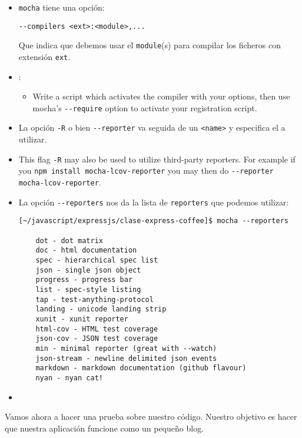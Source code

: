 \begin{itemize}
\item
\verb|mocha| tiene una opción:
\begin{verbatim}
--compilers <ext>:<module>,...  
\end{verbatim}
Que indica que debemos usar el \verb|module|(s) para compilar los ficheros
con extensión \verb|ext|.
\item
{}:

\begin{itemize}
\item
Write a script which activates the compiler with your options, 
then use mocha's \verb|--require| option to activate your registration script.
\end{itemize}
\item
La opción \verb|-R| o bien \verb|--reporter| va seguida de un \verb|<name>|
y especifica el  a utilizar.
\item
This flag \verb|-R| may also be used to utilize third-party reporters. For example if you 
\verb|npm install mocha-lcov-reporter| 
you may then do \verb|--reporter mocha-lcov-reporter|.
\item
La  opción \verb|--reporters| nos da la lista de \verb|reporters| que 
podemos utilizar:
\begin{verbatim}
[~/javascript/expressjs/clase-express-coffee]$ mocha --reporters

    dot - dot matrix
    doc - html documentation
    spec - hierarchical spec list
    json - single json object
    progress - progress bar
    list - spec-style listing
    tap - test-anything-protocol
    landing - unicode landing strip
    xunit - xunit reporter
    html-cov - HTML test coverage
    json-cov - JSON test coverage
    min - minimal reporter (great with --watch)
    json-stream - newline delimited json events
    markdown - markdown documentation (github flavour)
    nyan - nyan cat!
\end{verbatim}
\item
\end{itemize}

Vamos ahora a hacer una prueba sobre nuestro código. 
Nuestro objetivo es hacer que nuestra aplicación funcione como un pequeño blog.


